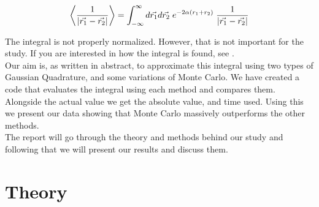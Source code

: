 \documentclass{article}
\begin{document}
\begin{equation}
    \left\langle \frac{1}{| \vec{r_1} - \vec{r_2} |} \right\rangle = \int_{-\infty} ^\infty d \vec{r_1} d \vec{r_2} \hspace{1mm} e^{- 2 \alpha (r_1 + r_2)} \hspace{1mm} \frac{1}{| \vec{r_1} - \vec{r_2} |}
\end{equation}

The integral is not properly normalized. However, that is not important for the study.
If you are interested in how the integral is found, see \cite{task}.\\
Our aim is, as written in abstract, to approximate this integral using two types of Gaussian Quadrature, and some variations of Monte Carlo. We have created a code that evaluates the integral using each method and compares them. Alongside the actual value we get the absolute value, and time used. Using this we present our data showing that Monte Carlo massively outperforms the other methods.\\
The report will go through the theory and methods behind our study and following that we will present our results and discuss them.

\vspace{1cm}

\section{Theory} \label{sec:Theory}
\end{document}
